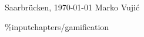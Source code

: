 \documentclass[11pt, a4paper, twoside]{Thesis}
\newcommand{\listofalgorithmes}{\tocfile{\listalgorithmcfname}{loa}}
\begin{document}
\begin{flushright}
\noindent Saarbr\"{u}cken, \today
\hfill
Marko Vuji\'c
\end{flushright}

\clearpage  %





\clearpage  %

\thispagestyle{empty}

\begin{spacing}{0.1}
\pagestyle{fancy}
\tableofcontents
\listoffigures
\listoftables
\end{spacing}

\clearpage

\mainmatter

%

%
%
%
\%input{chapters/gamification}
%
%
%
%
%
%
%
%
%



{\small}
\clearpage

\appendix


%
\end{document}
